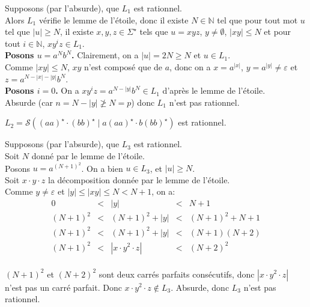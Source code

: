\begin{corrections}

  \begin{questions}
  \item Supposons (par l'absurde), que $L_1$ est rationnel.\\
    Alors $L_1$ vérifie le lemme de l'étoile, donc il existe $N \in \mathbb{N}$ tel que pour tout mot $u$ tel que $|u|\ge N$,
    il existe $x, y, z \in \Sigma^\star$ tels que $u=xyz$, $y\neq \emptyset$, $|xy| \le N$ et pour tout $i\in \mathbb{N}$, $xy^i z\in L_1$. \\
    \textbf{Posons $u = a^Nb^N$. } Clairement, on a $|u| = 2N \ge N$ et $u\in L_1$.\\
    Comme $|xy| \le N$, $xy$ n'est composé que de $a$, donc on a $x = a^{|x|}$, $y = a^{|y|} \neq \varepsilon$  et $z=a^{N-|x|-|y|}b^N$. \\
    \textbf{Posons $i = 0$. } On a $x y^i z = a^{N-|y|}b^N \in L_1$ d'après le lemme de l'étoile.\\
    Absurde (car $n = N-|y| \not\ge N = p$) donc $L_1$ n'est pas rationnel. 
  \item $L_2 = \mathcal{S}((aa)^\star \cdot (bb)^\star \mid a(aa)^\star \cdot b(bb)^\star )$ est rationnel.
  \item Supposons (par l'absurde), que $L_3$ est rationnel.\\
    Soit $N$ donné par le lemme de l'étoile. \\
    Posons $u = a^{{(N+1)}^2}$. On a bien $u \in L_3$, et $|u| \ge N$. \\
    Soit $x\cdot y \cdot z$ la décomposition donnée par le lemme de l'étoile. \\
    Comme $y\neq \varepsilon$ et $|y| \le |xy|\le N < N+1$, on a:
    $$\begin{array}{rcccl}
      0 &<& |y| &<& N+1\\
      (N+1)^2 &<& (N+1)^2 + |y| & < & (N+1)^2 + N+1\\
      (N+1)^2 &<& (N+1)^2 + |y| & < &  (N+1)(N+2)\\
      (N+1)^2 &<& |x\cdot y^2 \cdot z| & < & (N+2)^2\\
    \end{array}$$

    $(N+1)^2$ et $(N+2)^2$ sont deux carrés parfaits consécutifs, donc $|x\cdot y^2 \cdot z|$ n'est pas un carré parfait.
    Donc $x\cdot y^2 \cdot z \notin L_3$. Absurde, donc $L_3$ n'est pas rationnel. 
  \end{questions}

\end{corrections}

\endgroup
\endinput
